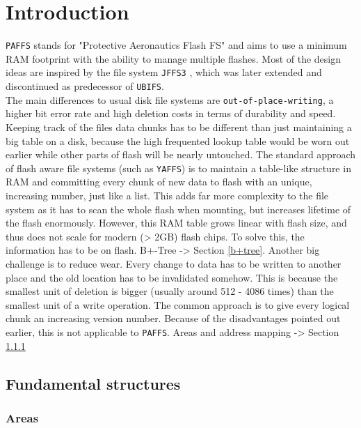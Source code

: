 
\chapter{Introduction}
\label{cha:introduction}

\texttt{PAFFS} stands for "Protective Aeronautics Flash FS" and aims to use a minimum RAM footprint with the ability to manage multiple flashes. Most of the design ideas are inspired by the file system \texttt{JFFS3} , which was later extended  and discontinued as predecessor of \texttt{UBIFS}.\\
The main differences to usual disk file systems are \texttt{out-of-place-writing}, a higher bit error rate and high deletion costs in terms of durability and speed. Keeping track of the files data chunks has to be different than just maintaining a big table on a disk, because the high frequented lookup table would be worn out earlier while other parts of flash will be nearly untouched. The standard approach of flash aware file systems (such as \texttt{YAFFS}) is to maintain a table-like structure in RAM and committing every chunk of new data to flash with an unique, increasing number, just like a list. This adds far more complexity to the file system as it has to scan the whole flash when mounting, but increases lifetime of the flash enormously. However, this RAM table grows linear with flash size, and thus does not scale for modern (> 2GB) flash chips. To solve this, the information has to be on flash. B+-Tree -> Section \ref{b+tree}.
Another big challenge is to reduce wear. Every change to data has to be written to another place and the old location has to be invalidated somehow. This is because the smallest unit of deletion is bigger (usually around 512 - 4086 times) than the smallest unit of a write operation. The common approach is to give every logical chunk an increasing version number. Because of the disadvantages pointed out earlier, this is not applicable to \texttt{PAFFS}. Areas and address mapping -> Section \ref{areas}

\section{Fundamental structures}
\label{sec:funst}


\subsection{Areas}
\label{areas}
